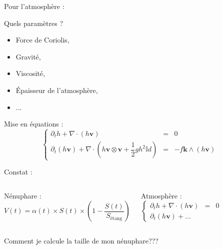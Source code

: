 \documentclass[11pt]{beamer}
\begin{document}
\begin{frame}{Pour l'atmosphère :}

Quels paramètres ?
\begin{itemize}
\item Force de Coriolis,
\item Gravité,
\item Viscosité,
\item \'Epaisseur de l'atmosphère,
\item ...
\end{itemize}

\begin{block}{Mise en équations :}
\begin{equation*}
\left \{
\begin{array}{rcl}
\partial_t h + \nabla \cdot \left( h \mathbf{v} \right) & = & 0 \\
\partial_t ( h \mathbf{v} ) + \nabla \cdot \left( h \mathbf{v} \otimes \mathbf{v} + \dfrac{1}{2} g h^2 \mathbb{I}d \right) & = & - f \mathbf{k} \wedge \left( h \mathbf{v} \right)
\end{array}
\right.
\end{equation*}
\end{block}
\end{frame}


\begin{frame}{Constat :}
\begin{columns}
\begin{block}{Nénuphare : }
$$V(t) = \alpha(t) \times S(t) \times \left( 1 - \dfrac{S(t)}{S_{\text{étang}}} \right)$$
\end{block}


\begin{block}{Atmosphère :}
\begin{equation*}
\left \{
\begin{array}{rcl}
\partial_t h + \nabla \cdot \left( h \mathbf{v} \right) & = & 0 \\
\partial_t ( h \mathbf{v} ) + ... &  & 
\end{array}
\right.
\end{equation*}
\end{block}
\end{columns}

\begin{alertblock}{}
Comment je calcule la taille de mon nénuphare???
\end{alertblock}

\end{frame}
\end{document}
